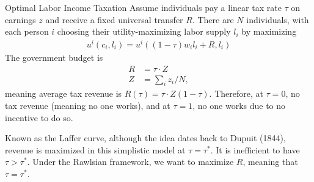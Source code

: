 \documentclass[10pt]{extarticle}
\begin{document}
  \begin{problem}{Optimal Labor Income Taxation}
    Assume individuals pay a linear tax rate $\tau$ on earnings $z$ and receive a fixed universal transfer $R$. There are $N$ individuals, with each person $i$ choosing their utility-maximizing labor supply $l_i$ by maximizing
    \begin{align*}
      u^i(c_i,l_i) = u^i\left((1-\tau)w_il_i + R, l_i\right)
    \end{align*}
    The government budget is
    \begin{align*}
      R &= \tau \cdot Z\\
      Z &= \sum_{i}z_i/N,
    \end{align*}
    meaning average tax revenue is $R(\tau) = \tau\cdot Z(1-\tau)$. Therefore, at $\tau = 0$, no tax revenue (meaning no one works), and at $\tau = 1$, no one works due to no incentive to do so.
    \begin{center}
    \end{center}
    Known as the Laffer curve, although the idea dates back to Dupuit (1844), revenue is maximized in this simplistic model at $\tau = \tau^{\ast}$. It is inefficient to have $\tau > \tau^{\ast}$. Under the Rawlsian framework, we want to maximize $R$, meaning that $\tau = \tau^{\ast}$.\\


\end{problem}
\end{document}
